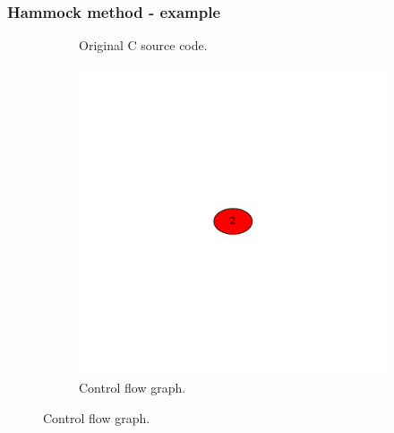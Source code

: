 \documentclass[aspectratio=1610]{beamer}
\begin{document}
\begin{frame}
	\frametitle{Hammock method - example}
	\begin{figure}[htbp]
		\centering
		\begin{subfigure}[b]{0.30\textwidth}
			\centering
			
			\caption{Original C source code.}
		\end{subfigure}
		\begin{subfigure}[b]{0.50\textwidth}
			\centering
			\includegraphics[height=0.6\paperheight]{inc/methods/hammock/example/without-break/main_0004b.png}
			\caption{Control flow graph.}
		\end{subfigure}
	\end{figure}
\end{frame}


\end{document}
